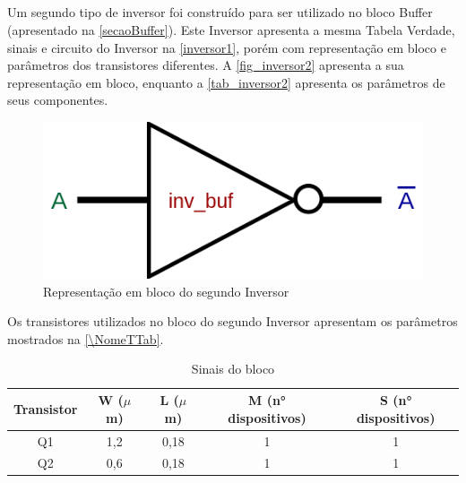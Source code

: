 \subsection{\NomeBloco}

Um segundo tipo de inversor foi constru\'ido para ser utilizado no bloco Buffer (apresentado na \autoref{secaoBuffer}). Este Inversor apresenta a mesma Tabela Verdade, sinais e circuito do Inversor na \autoref{inversor1}, por\'em com representa{\c c}\~ao em bloco e par\^ametros dos transistores diferentes. A \autoref{fig_inversor2} apresenta a sua representa{\c c}\~ao em bloco, enquanto a \autoref{tab_inversor2} apresenta os par\^ametros de seus componentes.

\begin{figure}[htb]
 \label{fig_inversor2}
 \centering
    \centering
    \caption{Representa{\c c}\~ao em bloco do segundo Inversor } \label{\NomePFig}
    \includegraphics[scale=0.5]{Circuitos/inv_buf_simbolo.png}
    \end{figure}

Os transistores utilizados no bloco do segundo Inversor apresentam os par\^ametros mostrados na \autoref{\NomeTTab}.

\begin{table}[htbp]
\caption{Sinais do bloco \NomeBloco}
\label{\NomeTTab}
\centering
\begin{tabular}{ccccc}
\toprule
Transistor & W ($\mu$m)  & L ($\mu$m)           & M (n° dispositivos) & S (n° dispositivos)\\
\midrule \midrule
Q1 & 1,2 & 0,18 & 1 & 1\\
\midrule
Q2 & 0,6 & 0,18 & 1 & 1\\
\bottomrule
\end{tabular}
\end{table}
\clearpage
